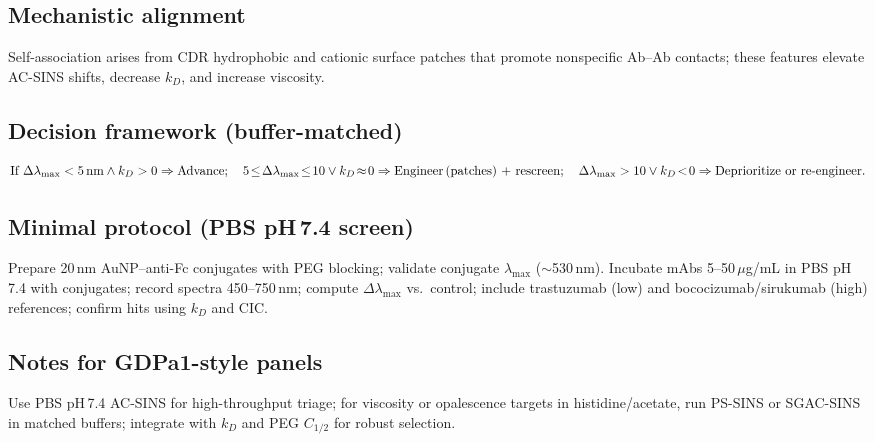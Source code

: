 \subsection*{Mechanistic alignment}
Self-association arises from CDR hydrophobic and cationic surface patches that promote nonspecific Ab–Ab contacts; these features elevate AC-SINS shifts, decrease \(k_D\), and increase viscosity. \cite{Xu2018,Jain2017}

\subsection*{Decision framework (buffer-matched)}
\[
\text{If } \Delta\lambda_{\max}<5\,\mathrm{nm} \land k_D>0 \Rightarrow \text{Advance};\quad
5\!\le\!\Delta\lambda_{\max}\!\le\!10 \lor k_D\!\approx\!0 \Rightarrow \text{Engineer\,(patches) + rescreen};\quad
\Delta\lambda_{\max}>10 \lor k_D\!<\!0 \Rightarrow \text{Deprioritize or re-engineer}.
\]
\cite{Liu2013,Wyatt_kD,Phan2022}

\subsection*{Minimal protocol (PBS pH\,7.4 screen)}
Prepare 20\,nm AuNP–anti-Fc conjugates with PEG blocking; validate conjugate \(\lambda_{\max}\) (\(\sim\)530\,nm). Incubate mAbs 5–50\,\(\mu\)g/mL in PBS pH\,7.4 with conjugates; record spectra 450–750\,nm; compute \(\Delta\lambda_{\max}\) vs.\ control; include trastuzumab (low) and bococizumab/sirukumab (high) references; confirm hits using \(k_D\) and CIC. \cite{Geng2016_Bioconj,Liu2013,Ferrara2022,Hedberg2018}

\subsection*{Notes for GDPa1-style panels}
Use PBS pH\,7.4 AC-SINS for high-throughput triage; for viscosity or opalescence targets in histidine/acetate, run PS-SINS or SGAC-SINS in matched buffers; integrate with \(k_D\) and PEG \(C_{1/2}\) for robust selection. \cite{Phan2022,Bailly2020,Zarzar2023}

